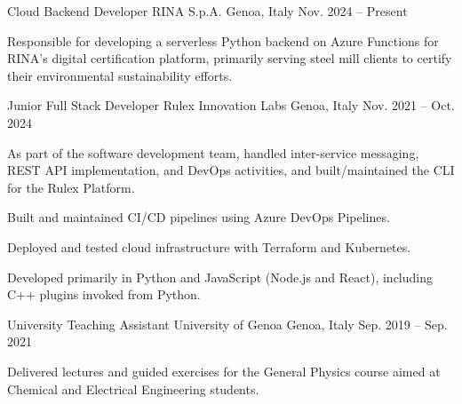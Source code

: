 


\begin{cventries}


\cventry
{Cloud Backend Developer} %
{RINA S.p.A.} %
{Genoa, Italy} %
{Nov. 2024 -- Present} %
{ %
\begin{cvitems}
  \item {Responsible for developing a serverless Python backend on Azure Functions for RINA's digital certification platform, primarily serving steel mill clients to certify their environmental sustainability efforts.}
\end{cvitems}
}


\cventry
{Junior Full Stack Developer} %
{Rulex Innovation Labs} %
{Genoa, Italy} %
{Nov. 2021 -- Oct. 2024} %
{ %
\begin{cvitems}
  \item {As part of the software development team, handled inter-service messaging, REST API implementation, and DevOps activities, and built/maintained the CLI for the Rulex Platform.}
  \item {Built and maintained CI/CD pipelines using Azure DevOps Pipelines.}
  \item {Deployed and tested cloud infrastructure with Terraform and Kubernetes.}
  \item {Developed primarily in Python and JavaScript (Node.js and React), including C++ plugins invoked from Python.}
\end{cvitems}
}


\cventry
{University Teaching Assistant} %
{University of Genoa} %
{Genoa, Italy} %
{Sep. 2019 -- Sep. 2021} %
{ %
\begin{cvitems}
  \item {Delivered lectures and guided exercises for the General Physics course aimed at Chemical and Electrical Engineering students.}
\end{cvitems}
}


\end{cventries}
